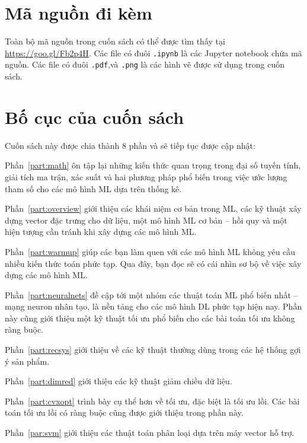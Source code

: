 \section{Mã nguồn đi kèm}
Toàn bộ mã nguồn trong cuốn sách có thể được tìm thấy tại
\url{https://goo.gl/Fb2p4H}. Các file có đuôi \texttt{.ipynb} là các
Jupyter notebook chứa mã nguồn. Các file có đuôi \texttt{.pdf},và \texttt{.png}
là các hình vẽ được sử dụng trong cuốn sách.

\section{Bố cục của cuốn sách}
Cuốn sách này được chia thành 8 phần và sẽ tiếp tục được cập nhật:

{Phần~\ref{part:math}} ôn tập lại những kiến thức quan trọng trong đại số tuyến
tính, giải tích ma trận, xác suất và hai phương pháp phổ biến trong việc ước
lượng tham số cho các mô hình ML dựa trên thống kê.

Phần~\ref{part:overview} giới thiệu các khái niệm cơ bản trong ML, các kỹ thuật
xây dựng vector đặc trưng cho dữ liệu, một mô hình ML cơ bản -- hồi quy và một hiện tượng cần tránh khi xây dựng các mô hình ML.

Phần~\ref{part:warmup} giúp các bạn làm quen với các mô hình ML không yêu cầu
nhiều kiến thức toán phức tạp. Qua đây, bạn đọc sẽ có cái nhìn sơ bộ về việc xây
dựng các mô hình ML.


Phần~\ref{part:neuralnets} đề cập tới một nhóm các thuật toán ML phổ biến nhất
-- mạng neuron nhân tạo, là nền tảng cho các mô hình DL phức tạp
hiện nay. Phần này cũng giới thiệu một kỹ thuật tối ưu phổ biến cho các bài toán
tối ưu không ràng buộc.

Phần~\ref{part:recsys} giới thiệu về các kỹ thuật thường dùng trong các hệ thống
gợi ý sản phẩm.

Phần~\ref{part:dimred} giới thiệu các kỹ thuật giảm chiều dữ liệu.

Phần~\ref{part:cvxopt} trình bày cụ thể hơn về tối ưu, đặc biệt là tối ưu lồi.
Các bài toán tối ưu lồi có ràng buộc cũng được giới thiệu trong phần này.

Phần~\ref{par:svm} giới thiệu các thuật toán phân loại dựa trên máy vector hỗ trợ.


